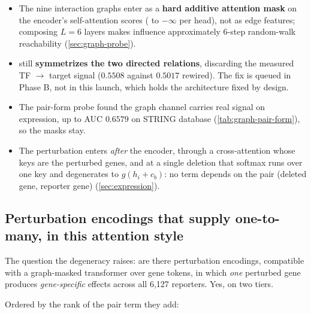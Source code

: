 \begin{itemize}
\item The nine interaction graphs enter as a \textbf{hard additive attention mask} on the
  encoder's self-attention scores ( to $-\infty$ per head), not as edge
  features; composing $L = 6$ layers makes influence approximately 6-step random-walk
  reachability (\cref{sec:graph-probe}).
\item {} still \textbf{symmetrizes the two directed relations},
  discarding the measured TF $\to$ target signal ($0.5508$ against $0.5017$ rewired). The
  fix is queued in Phase B, not in this launch, which holds the architecture fixed by
  design.
\item The pair-form probe found the graph channel carries real signal on expression, up to
  AUC $0.6579$ on STRING database (\cref{tab:graph-pair-form}), so the masks stay.
\item The perturbation enters \emph{after} the encoder, through a cross-attention whose
  keys are the perturbed genes, and at a single deletion that softmax runs over one key
  and degenerates to $g(h_i + c_b)$: no term depends on the pair (deleted gene, reporter
  gene) (\cref{sec:expression}).
\end{itemize}

\subsection{Perturbation encodings that supply one-to-many, in this attention style
}

The question the degeneracy raises: are there perturbation encodings, compatible with a
graph-masked transformer over gene tokens, in which \emph{one} perturbed gene produces
\emph{gene-specific} effects across all 6,127 reporters. Yes, on two tiers.

 Ordered by the rank of the pair term they add:


